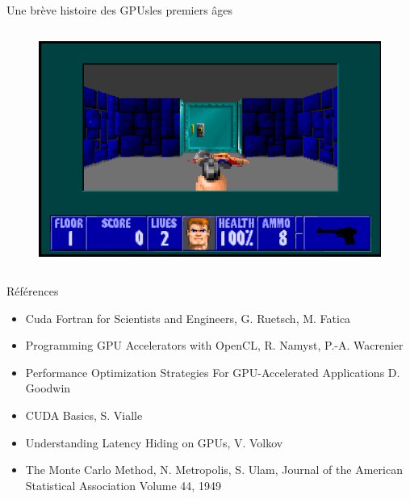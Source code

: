 \documentclass[11pt,mathserif]{beamer}
\newcommand{\Pdf}{\faFilePdfO}
\newcommand{\liburu}{\faBook}
\begin{document}
\begin{frame}{Une brève histoire des GPUs}{les premiers âges}
\begin{columns}[t]
\begin{figure}[htbp]
  \includegraphics[width=0.8\linewidth]{fig/wolf2.png}
    \end{figure}
  \end{columns}
\end{frame}

\begin{frame}{Références}
\begin{itemize}[<+->]
  \item[\liburu] Cuda Fortran for Scientists and Engineers, G. Ruetsch, M. Fatica
  \item[\Pdf] Programming GPU Accelerators with OpenCL, R. Namyst, P.-A. Wacrenier \href{https://raymond-namyst.emi.u-bordeaux.fr/ens/pap/PAP-GPU.pdf}{}
  \item[\Pdf] Performance Optimization Strategies For GPU-Accelerated Applications D. Goodwin \href{https://on-demand.gputechconf.com/gtc/2013/presentations/S3046-Performance-Optimization-Strategies-for-GPU-Accelerated-Apps.pdf}{}
  \item[\faFilePowerpointO] CUDA Basics, S. Vialle \href{http://www.metz.supelec.fr/metz/personnel/vialle/course/PPS-5A-GPGPU/notes-de-cours-specifiques/PPS-GPU-02-CUDA-Basics-2spp.pdf}{}
  \item[\Pdf] Understanding Latency Hiding on GPUs, V. Volkov \href{http://www2.eecs.berkeley.edu/Pubs/TechRpts/2016/EECS-2016-143.pdf}{}
  \item[\Pdf] The Monte Carlo Method, N. Metropolis, S. Ulam,  Journal of the American Statistical Association Volume 44, 1949 
    \href{http://www.tandfonline.com/doi/abs/10.1080/01621459.1949.10483310}{}
\end{itemize}
\end{frame}
\end{document}
